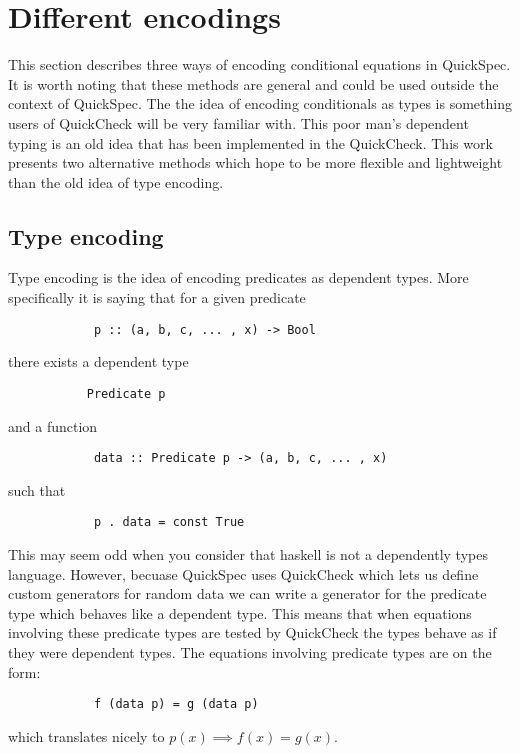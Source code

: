 \section{Different encodings}\label{encodings}

    This section describes three
    ways of encoding conditional
    equations in QuickSpec. It is
    worth noting that these methods
    are general and could be used outside
    the context of QuickSpec. The
    the idea of encoding conditionals
    as types is something users of
    QuickCheck %
    will be very familiar with. This poor
    man's dependent typing is an old idea that has
    been implemented in the QuickCheck.%
    This work presents two alternative methods
    which hope to be more flexible and lightweight
    than the old idea of type encoding.

    \subsection{Type encoding}\label{TE}

        Type encoding is the idea of encoding
        predicates as dependent types. More specifically
        it is saying that for a given predicate
        \begin{verbatim}
            p :: (a, b, c, ... , x) -> Bool
        \end{verbatim}
        there exists a dependent type
        \begin{verbatim}
           Predicate p
        \end{verbatim}
        and a function 
        \begin{verbatim}
            data :: Predicate p -> (a, b, c, ... , x)
        \end{verbatim}
        such that 
        \begin{verbatim}
            p . data = const True
        \end{verbatim}
        This may seem odd when you consider that haskell is not a dependently types
        language. However, becuase QuickSpec uses QuickCheck which lets us define
        custom generators for random data we can write a generator for 
        the predicate type which behaves like a dependent type.
        This means that when equations involving these predicate
        types are tested by QuickCheck the types behave as if they were dependent types.
        The equations involving predicate types are on the form:
        \begin{verbatim}
            f (data p) = g (data p)
        \end{verbatim}
        which translates nicely to $p(x) \implies f(x) = g(x)$.

